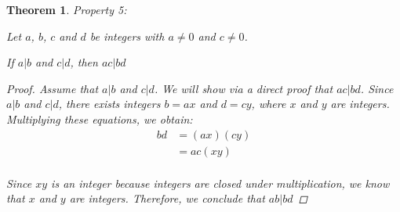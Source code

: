 \documentclass{book}
\newtheorem{theorem}{Theorem}[section]
\theoremstyle{definition}
\theoremstyle{remark}
\begin{document}
\begin{theorem}
Property 5: \\
    \begin{tcolorbox}
        Let $a$, $b$, $c$ and $d$ be integers with $a \neq 0$ and $c \neq 0$. 
        \begin{center}
            If $a | b$ and $c | d$, then $ac | bd$
        \end{center}
    \end{tcolorbox}

    \begin{proof}
        Assume that $a | b$ and $c | d$. We will show via a direct proof that $ac | bd$. Since $a | b$ and $c | d$, there exists integers $b = ax$ and $d = cy$, where $x$ and $y$ are integers. Multiplying these equations, we obtain: 
            \begin{align*}
            	bd & = (ax)(cy) \\	
            	& = ac(xy) \\
            \end{align*}

        Since $xy$ is an integer because integers are closed under multiplication, we know that $x$ and $y$ are integers. Therefore, we conclude that $ab | bd$
    \end{proof}
\end{theorem}
\end{document}
